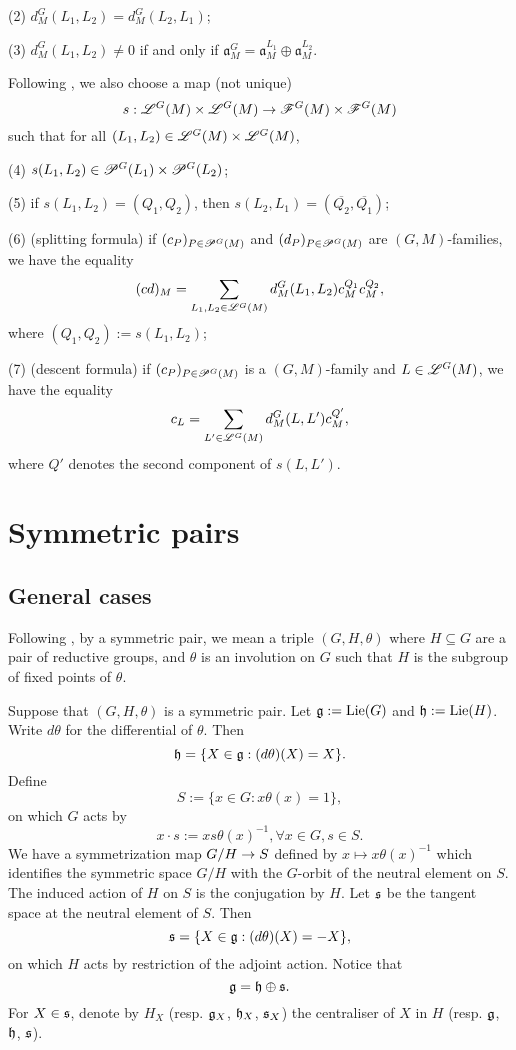 \documentclass[a4paper]{amsart}
\newcommand{\fa}{{\mathfrak{a}}} \newcommand{\fb}{{\mathfrak{b}}}\newcommand{\fc}{{\mathfrak{c}}} \newcommand{\fd}{{\mathfrak{d}}}
\newcommand{\alg}{{\mathrm{alg}}}                    \newcommand{\Alb}{{\mathrm{Alb}}}            \newcommand{\an}{{\mathrm{an}}}
\newcommand{\Lie}{{\mathrm{Lie}}}                    \newcommand{\LL}[1]{L^\alg(E^{(#1)}, 1)}       \newcommand{\Mp}{{\mathrm{Mp}}}
\newcommand{\ov}{\overline}
\theoremstyle{definition}
\theoremstyle{remark}
\numberwithin{equation}{subsection}
\begin{document}
(2) $d_M^G(L_1,L_2)=d_M^G(L_2,L_1)$; 

(3) $d_M^G(L_1,L_2)\neq 0$ if and only if $\fa_M^G=\fa_M^{L_1}\oplus\fa_M^{L_2}$. 

Following \cite[\S II.4]{MR1344131}, we also choose a map (not unique)
$$ s: \mathscr{L}^G(M)\times\mathscr{L}^G(M)\rightarrow\mathscr{F}^G(M)\times\mathscr{F}^G(M) $$
such that for all $(L_1,L_2)\in\mathscr{L}^G(M)\times\mathscr{L}^G(M)$, 

(4) $s(L_1, L_2)\in\mathscr{P}^G(L_1)\times\mathscr{P}^G(L_2)$; 

(5) if $s(L_1,L_2)=(Q_1,Q_2)$, then $s(L_2,L_1)=(\ov{Q_2},\ov{Q_1})$; 

(6) (splitting formula) if $(c_P)_{P\in\mathscr{P}^G(M)}$ and $(d_P)_{P\in\mathscr{P}^G(M)}$ are $(G,M)$-families, we have the equality
$$ (cd)_M=\sum_{L_1,L_2\in\mathscr{L}^G(M)} d_M^G(L_1,L_2)c_M^{Q_1}c_M^{Q_2}, $$
where $(Q_1,Q_2):=s(L_1,L_2)$; 

(7) (descent formula) if $(c_P)_{P\in\mathscr{P}^G(M)}$ is a $(G,M)$-family and $L\in\mathscr{L}^G(M)$, we have the equality
$$ c_L=\sum_{L'\in\mathscr{L}^G(M)} d_M^G(L,L')c_M^{Q'}, $$
where $Q'$ denotes the second component of $s(L,L')$. 




\section{\textbf{Symmetric pairs}}\label{secsympai}

\subsection{General cases}\label{generalcases}

Following \cite[Definition 7.1.1]{MR2553879}, by a symmetric pair, we mean a triple $(G, H, \theta)$ where $H\subseteq G$ are a pair of reductive groups, and $\theta$ is an involution on $G$ such that $H$ is the subgroup of fixed points of $\theta$. 

Suppose that $(G, H, \theta)$ is a symmetric pair. Let $\fg:=\Lie(G)$ and $\fh:=\Lie(H)$. Write $d\theta$ for the differential of $\theta$. Then 
$$ {\mathfrak{h}}=\{X\in{\mathfrak{g}}:(d\theta)(X)=X\}. $$ 
Define 
$$ S:=\{x\in G: x\theta(x)=1\}, $$
on which $G$ acts by 
$$ x\cdot s:=xs\theta(x)^{-1}, \forall x\in G, s\in S. $$
We have a symmetrization map $G/H\rightarrow S$ defined by $x\mapsto x\theta(x)^{-1}$ which identifies the symmetric space $G/H$ with the $G$-orbit of the neutral element on $S$. The induced action of $H$ on $S$ is the conjugation by $H$. 
Let ${\mathfrak{s}}$ be the tangent space at the neutral element of $S$. Then 
$$ {\mathfrak{s}}=\{X\in{\mathfrak{g}}: (d\theta)(X)=-X\}, $$ 
on which $H$ acts by restriction of the adjoint action. Notice that 
$$ {\mathfrak{g}}={\mathfrak{h}}\oplus{\mathfrak{s}}. $$ 
For $X\in{\mathfrak{s}}$, denote by $H_X$ (resp. ${\mathfrak{g}}_X$, ${\mathfrak{h}}_X$, ${\mathfrak{s}}_X$) the centraliser of $X$ in $H$ (resp. ${\mathfrak{g}}$, ${\mathfrak{h}}$, ${\mathfrak{s}}$). 
\end{document}
